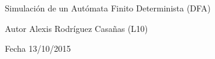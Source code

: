 Simulación de un Autómata Finito Determinista (D\+F\+A) \begin{DoxyAuthor}{Autor}
Alexis Rodríguez Casañas (L10) 
\end{DoxyAuthor}
\begin{DoxyDate}{Fecha}
13/10/2015 
\end{DoxyDate}
